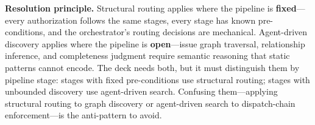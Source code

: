 \documentclass[11pt,a4paper]{article}
\begin{document}
\begin{insightbox}
\textbf{Resolution principle.}  Structural routing applies where the pipeline is \textbf{fixed}---every authorization follows the same stages, every stage has known pre-conditions, and the orchestrator's routing decisions are mechanical.  Agent-driven discovery applies where the pipeline is \textbf{open}---issue graph traversal, relationship inference, and completeness judgment require semantic reasoning that static patterns cannot encode.  The deck needs both, but it must distinguish them by pipeline stage: stages with fixed pre-conditions use structural routing; stages with unbounded discovery use agent-driven search.  Confusing them---applying structural routing to graph discovery or agent-driven search to dispatch-chain enforcement---is the anti-pattern to avoid.
\end{insightbox}
\end{document}
